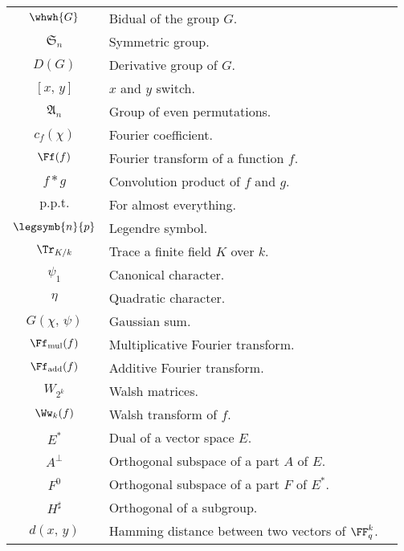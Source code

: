 \begin{center}
\begin{supertabular}{| c | p{9cm} | c |}
$ \whwh{G} $ & Bidual of the group $ G $. & \pageref{notation-16} \\[1mm]
$ \mathfrak{S}_n $ & Symmetric group. & \pageref{notation-17} \\[1mm]
$ D (G) $ & Derivative group of $ G $. & \pageref{notation-18} \\[1mm]
$ [x, \, y] $ & $ x $ and $ y $ switch. & \pageref{notation-19} \\[1mm]
$ \mathfrak{A}_n $ & Group of even permutations. & \pageref{notation-20} \\[1mm]
$ c_f(\chi) $ & Fourier coefficient. & \pageref{notation-21} \\[1mm]
$ \Ff(f) $ & Fourier transform of a function $ f $. & \pageref{notation-22} \\[1mm]
$ f * g $ & Convolution product of $ f $ and $ g $. & \pageref{notation-23} \\[1mm]
$ \text{p.p.t.} $ & For almost everything. & \pageref{notation-24} \\[1mm]
$ \legsymb{n}{p} $ & Legendre symbol. & \pageref{notation-25} \\[1mm]
$ \Tr_{K / k} $ & Trace a finite field $ K $ over $ k $. & \pageref{notation-26} \\[1mm]
$ \psi_1 $ & Canonical character. & \pageref{notation-27} \\[1mm]
$ \eta $ & Quadratic character. & \pageref{notation-28} \\[1mm]
$ G (\chi, \, \psi) $ & Gaussian sum. & \pageref{notation-29} \\[1mm]
$ \Ff_{\text{mul}} (f) $ & Multiplicative Fourier transform. & \pageref{notation-30} \\[1mm]
$ \Ff_{\text{add}} (f) $ & Additive Fourier transform. & \pageref{notation-31} \\[1mm]
$ W_{2^k} $ & Walsh matrices. & \pageref{notation-32} \\[1mm]
$ \Ww_k (f) $ & Walsh transform of $ f $. & \pageref{notation-33} \\[1mm]
$ E^* $ & Dual of a vector space $ E $. & \pageref{notation-34} \\[1mm]
$ A^{\bot} $ & Orthogonal subspace of a part $ A $ of $ E $. & \pageref{notation-35} \\[1mm]
$ F^{0} $ & Orthogonal subspace of a part $ F $ of $ E^* $. & \pageref{notation-36} \\[1mm]
$ H^{\sharp} $ & Orthogonal of a subgroup. & \pageref{notation-37} \\[1mm]
$ d (x, \, y) $ & Hamming distance between two vectors of $ \FF_q^k $. & \pageref{notation-38} \\[1mm]

\end{supertabular}
\end{center}
